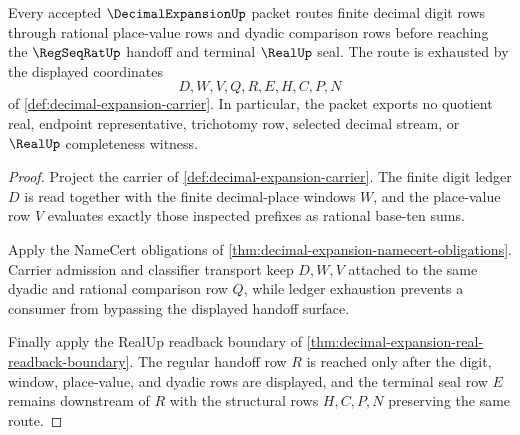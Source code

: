 \begin{theorem}\label{thm:decimal-expansion-regseqrat-handoff}
Every accepted $\DecimalExpansionUp$ packet routes finite decimal digit rows
through rational place-value rows and dyadic comparison rows before reaching
the $\RegSeqRatUp$ handoff and terminal $\RealUp$ seal. The route is exhausted
by the displayed coordinates
$$
D,W,V,Q,R,E,H,C,P,N
$$
of \autoref{def:decimal-expansion-carrier}. In particular, the packet exports
no quotient real, endpoint representative, trichotomy row, selected decimal
stream, or $\RealUp$ completeness witness.
\end{theorem}
\begin{proof}
Project the carrier of \autoref{def:decimal-expansion-carrier}. The finite
digit ledger $D$ is read together with the finite decimal-place windows $W$,
and the place-value row $V$ evaluates exactly those inspected prefixes as
rational base-ten sums.

Apply the NameCert obligations of
\autoref{thm:decimal-expansion-namecert-obligations}. Carrier admission and
classifier transport keep $D,W,V$ attached to the same dyadic and rational
comparison row $Q$, while ledger exhaustion prevents a consumer from bypassing
the displayed handoff surface.

Finally apply the RealUp readback boundary of
\autoref{thm:decimal-expansion-real-readback-boundary}. The regular handoff
row $R$ is reached only after the digit, window, place-value, and dyadic rows
are displayed, and the terminal seal row $E$ remains downstream of $R$ with
the structural rows $H,C,P,N$ preserving the same route.
\end{proof}

